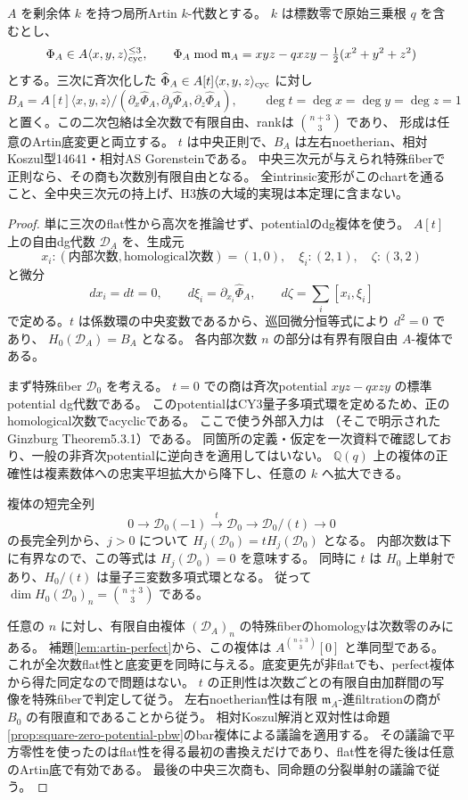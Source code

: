 \begin{theorem}
\label{thm:artin-potential-envelope}
$A$ を剰余体 $k$ を持つ局所Artin $k$-代数とする。
$k$ は標数零で原始三乗根 $q$ を含むとし、
\[
 \Phi_A\in A\langle x,y,z\rangle_{\rm cyc}^{\le3},\qquad
 \Phi_A\bmod\mathfrak m_A=
 xyz-qxzy-\tfrac12(x^2+y^2+z^2)
\]
とする。三次に斉次化した $\widehat\Phi_A\in A[t]\langle x,y,z\rangle_{\rm cyc}$ に対し
\[
 B_A=A[t]\langle x,y,z\rangle/
 (\partial_x\widehat\Phi_A,\partial_y\widehat\Phi_A,
 \partial_z\widehat\Phi_A),\qquad \deg t=\deg x=\deg y=\deg z=1
\]
と置く。この二次包絡は全次数で有限自由、rankは $\binom{n+3}{3}$ であり、
形成は任意のArtin底変更と両立する。
$t$ は中央正則で、$B_A$ は左右noetherian、相対Koszul型14641・相対AS Gorensteinである。
中央三次元が与えられ特殊fiberで正則なら、その商も次数別有限自由となる。
全intrinsic変形がこのchartを通ること、全中央三次元の持上げ、H3族の大域的実現は本定理に含まない。
\end{theorem}
\begin{proof}
単に三次のflat性から高次を推論せず、potentialのdg複体を使う。
$A[t]$ 上の自由dg代数 $\mathcal D_A$ を、生成元
\[
 x_i:(\text{内部次数},\text{homological次数})=(1,0),\quad
 \xi_i:(2,1),\quad \zeta:(3,2)
\]
と微分
\[
 d x_i=d t=0,\qquad d\xi_i=\partial_{x_i}\widehat\Phi_A,
 \qquad d\zeta=\sum_i[x_i,\xi_i]
\]
で定める。$t$ は係数環の中央変数であるから、巡回微分恒等式により $d^2=0$ であり、
$H_0(\mathcal D_A)=B_A$ となる。
各内部次数 $n$ の部分は有界有限自由 $A$-複体である。

まず特殊fiber $\mathcal D_0$ を考える。
$t=0$ での商は斉次potential $xyz-qxzy$ の標準potential dg代数である。
このpotentialはCY3量子多項式環を定めるため、正のhomological次数でacyclicである。
ここで使う外部入力は \cite[\S7.1, (7.1.4)]{EG}
（そこで明示されたGinzburg Theorem5.3.1）である。
同箇所の定義・仮定を一次資料で確認しており、一般の非斉次potentialに逆向きを適用してはいない。
$\mathbb Q(q)$ 上の複体の正確性は複素数体への忠実平坦拡大から降下し、任意の $k$ へ拡大できる。

複体の短完全列
\[
 0\longrightarrow\mathcal D_0(-1)\xrightarrow{t}\mathcal D_0
 \longrightarrow\mathcal D_0/(t)\longrightarrow0
\]
の長完全列から、$j>0$ について $H_j(\mathcal D_0)=tH_j(\mathcal D_0)$ となる。
内部次数は下に有界なので、この等式は $H_j(\mathcal D_0)=0$ を意味する。
同時に $t$ は $H_0$ 上単射であり、$H_0/(t)$ は量子三変数多項式環となる。
従って $\dim H_0(\mathcal D_0)_n=\binom{n+3}{3}$ である。

任意の $n$ に対し、有限自由複体 $(\mathcal D_A)_n$ の特殊fiberのhomologyは次数零のみにある。
補題\ref{lem:artin-perfect}から、この複体は $A^{\binom{n+3}{3}}[0]$ と準同型である。
これが全次数flat性と底変更を同時に与える。底変更先が非flatでも、perfect複体から得た同定なので問題はない。
$t$ の正則性は次数ごとの有限自由加群間の写像を特殊fiberで判定して従う。
左右noetherian性は有限 $\mathfrak m_A$-進filtrationの商が $B_0$ の有限直和であることから従う。
相対Koszul解消と双対性は命題\ref{prop:square-zero-potential-pbw}のbar複体による議論を適用する。
その議論で平方零性を使ったのはflat性を得る最初の書換えだけであり、flat性を得た後は任意のArtin底で有効である。
最後の中央三次商も、同命題の分裂単射の議論で従う。
\end{proof}

